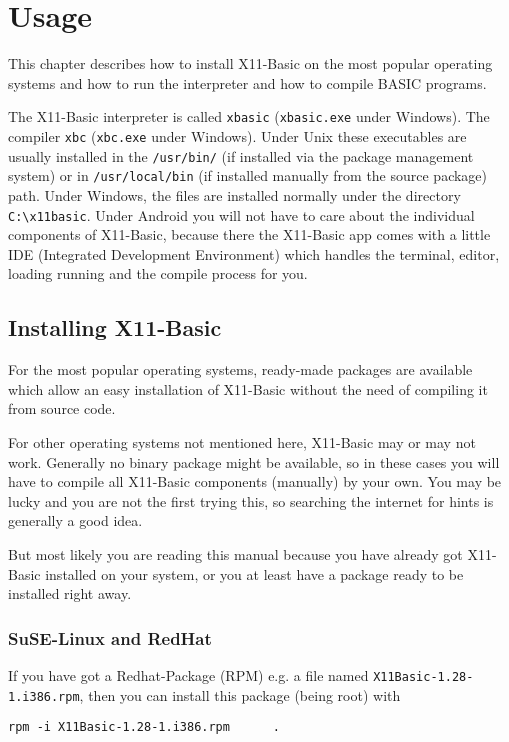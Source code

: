 \chapter{Usage}

This chapter describes how to install X11-Basic on the most popular operating 
systems and how to run the interpreter and how to compile BASIC programs.

The X11-Basic interpreter is called \verb|xbasic| (\verb|xbasic.exe| under 
Windows). The compiler \verb|xbc| (\verb|xbc.exe| under  Windows). Under Unix
these executables are usually installed in the \verb|/usr/bin/| (if installed
via  the package management system) or in \verb|/usr/local/bin|  (if installed
manually from the source package) path. Under Windows, the files are installed
normally under the directory \verb|C:\x11basic|. Under Android you will not have
to care about the individual components of X11-Basic,  because there the
X11-Basic app comes with a little IDE  (Integrated Development Environment)
which handles the terminal, editor, loading running and the compile process 
for you.

\section{Installing X11-Basic}

For the most popular operating systems, ready-made packages are  available which
allow an easy installation of X11-Basic without the  need of compiling it from
source code. 

For other operating systems not mentioned here, X11-Basic may or may not work. 
Generally no binary package might be available, so in these cases you will have 
to compile all X11-Basic components (manually) by your own. You may be lucky 
and you are not the first trying this, so searching the internet for hints is 
generally a good idea.

But most likely you are reading this manual because you have already got 
X11-Basic installed on your system, or you at least have a package ready 
to be installed right away.

\subsection*{SuSE-Linux and RedHat}

If you have got a Redhat-Package (RPM) e.g. a file named 
\verb|X11Basic-1.28-1.i386.rpm|, then you can install this package (being
root) with 
\begin{verbatim}
rpm -i X11Basic-1.28-1.i386.rpm      .
\end{verbatim}

